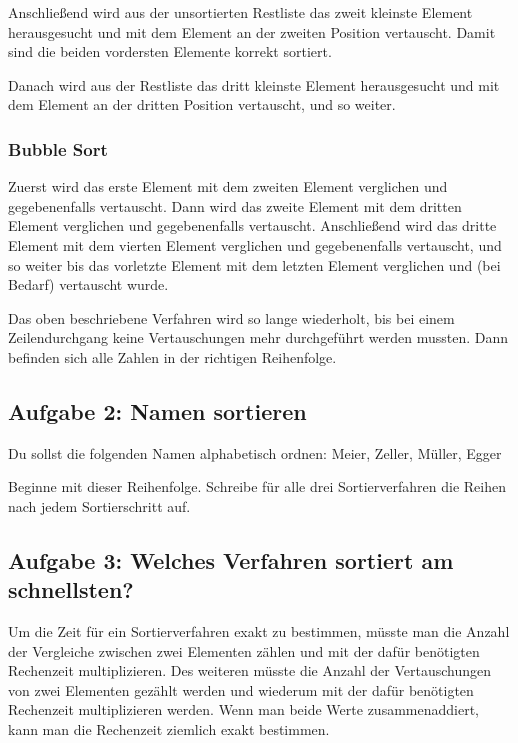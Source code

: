 Anschließend wird aus der unsortierten Restliste das zweit kleinste Element
herausgesucht und mit dem Element an der zweiten Position vertauscht. Damit
sind die beiden vordersten Elemente korrekt sortiert.

Danach wird aus der Restliste das dritt kleinste Element herausgesucht und mit
dem Element an der dritten Position vertauscht, und so weiter.

\subsubsection{Bubble Sort}

Zuerst wird das erste Element mit dem zweiten Element verglichen und
gegebenenfalls vertauscht. Dann wird das zweite Element mit dem dritten Element
verglichen und gegebenenfalls vertauscht. Anschließend wird das dritte Element
mit dem vierten Element verglichen und gegebenenfalls vertauscht, und so weiter
bis das vorletzte Element mit dem letzten Element verglichen und (bei Bedarf)
vertauscht wurde.

Das oben beschriebene Verfahren wird so lange wiederholt, bis bei einem
Zeilendurchgang keine Vertauschungen mehr durchgeführt werden mussten. Dann
befinden sich alle Zahlen in der richtigen Reihenfolge.


\subsection{Aufgabe 2: Namen sortieren}

Du sollst die folgenden Namen alphabetisch ordnen: Meier, Zeller, Müller, Egger

Beginne mit dieser Reihenfolge. Schreibe für alle drei Sortierverfahren die
Reihen nach jedem Sortierschritt auf.


\subsection{Aufgabe 3: Welches Verfahren sortiert am schnellsten?}

Um die Zeit für ein Sortierverfahren exakt zu bestimmen, müsste man die Anzahl
der Vergleiche zwischen zwei Elementen zählen und mit der dafür benötigten
Rechenzeit multiplizieren. Des weiteren müsste die Anzahl der Vertauschungen
von zwei Elementen gezählt werden und wiederum mit der dafür benötigten
Rechenzeit multiplizieren werden. Wenn man beide Werte zusammenaddiert, kann
man die Rechenzeit ziemlich exakt bestimmen.


